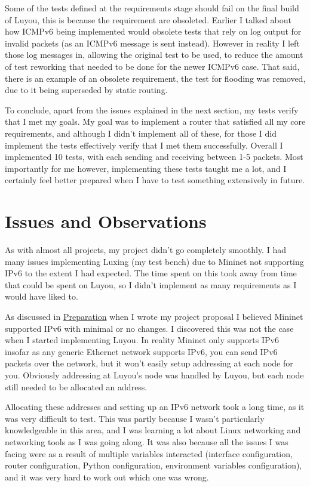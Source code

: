 \documentclass[12pt,a4paper,twoside,openright]{report}
\begin{document}
\bigskip

Some of the tests defined at the requirements stage should fail on the final build of Luyou, this is because the requirement are obsoleted. Earlier I talked about how ICMPv6 being implemented would obsolete tests that rely on log output for invalid packets (as an ICMPv6 message is sent instead). However in reality I left those log messages in, allowing the original test to be used, to reduce the amount of test reworking that needed to be done for the newer ICMPv6 case.  That said, there is an example of an obsolete requirement, the test for flooding was removed, due to it being superseded by static routing. 

\bigskip

To conclude, apart from the issues explained in the next section, my tests verify that I met my goals.  My goal was to implement a router that satisfied all my core requirements, and although I didn't implement all of these, for those I did implement the tests effectively verify that I met them successfully.  Overall I implemented 10 tests, with each sending and receiving between 1-5 packets. Most importantly for me however, implementing these tests taught me a lot, and I certainly feel better prepared when I have to test something extensively in future.

\section{Issues and Observations}

As with almost all projects, my project didn't go completely smoothly. I had many issues implementing Luxing (my test bench) due to Mininet not supporting IPv6 to the extent I had expected. The time spent on this took away from time that could be spent on Luyou, so I didn't implement as many requirements as I would have liked to.

\bigskip

As discussed in \hyperref[chap::preparation]{Preparation} when I wrote my project proposal I believed Mininet supported IPv6 with minimal or no changes.  I discovered this was not the case when I started implementing Luyou.  In reality Mininet only supports IPv6 insofar as any generic Ethernet network supports IPv6, you can send IPv6 packets over the network, but it won't easily setup addressing at each node for you.  Obviously addressing at Luyou's node was handled by Luyou, but each node still needed to be allocated an address. 

Allocating these addresses and setting up an IPv6 network took a long time, as it was very difficult to test.  This was partly because I wasn't particularly knowledgeable in this area, and I was learning a lot about Linux networking and networking tools as I was going along. It was also because all the issues I was facing were as a result of multiple variables interacted (interface configuration, router configuration, Python configuration, environment variables configuration), and it was very hard to work out which one was wrong.  
\end{document}
